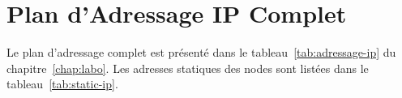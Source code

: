 \chapter{Plan d'Adressage IP Complet}
\label{annexe:adressage}

Le plan d'adressage complet est présenté dans le tableau~\ref{tab:adressage-ip} du chapitre~\ref{chap:labo}. Les adresses statiques des nodes sont listées dans le tableau~\ref{tab:static-ip}.
